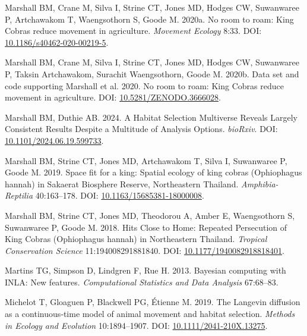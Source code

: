 \documentclass[10pt,a4paper]{article}
\newlength{\cslhangindent}
\newenvironment{CSLReferences}[2] %
 {\begin{list}{}{%
  \setlength{\itemindent}{0pt}
  \setlength{\leftmargin}{0pt}
  \setlength{\parsep}{0pt}
  \ifodd #1
   \setlength{\leftmargin}{\cslhangindent}
   \setlength{\itemindent}{-1\cslhangindent}
  \fi
  \setlength{\itemsep}{#2\baselineskip}}}
 {\end{list}}
\begin{document}
\begin{CSLReferences}{1}{0}
Marshall BM, Crane M, Silva I, Strine CT, Jones MD, Hodges CW, Suwanwaree P, Artchawakom T, Waengsothorn S, Goode M. 2020a. No room to roam: {King} {Cobras} reduce movement in agriculture. \emph{Movement Ecology} 8:33. DOI: \href{https://doi.org/10.1186/s40462-020-00219-5}{10.1186/s40462-020-00219-5}.

Marshall BM, Crane M, Silva I, Strine CT, Jones MD, Hodges CW, Suwanwaree P, Taksin Artchawakom, Surachit Waengsothorn, Goode M. 2020b. Data set and code supporting {Marshall} et al. 2020. {No} room to roam: {King} {Cobras} reduce movement in agriculture. DOI: \href{https://doi.org/10.5281/ZENODO.3666028}{10.5281/ZENODO.3666028}.

Marshall BM, Duthie AB. 2024. A {Habitat} {Selection} {Multiverse} {Reveals} {Largely} {Consistent} {Results} {Despite} a {Multitude} of {Analysis} {Options}. \emph{bioRxiv}. DOI: \href{https://doi.org/10.1101/2024.06.19.599733}{10.1101/2024.06.19.599733}.

Marshall BM, Strine CT, Jones MD, Artchawakom T, Silva I, Suwanwaree P, Goode M. 2019. Space fit for a king: Spatial ecology of king cobras ({Ophiophagus} hannah) in {Sakaerat} {Biosphere} {Reserve}, {Northeastern} {Thailand}. \emph{Amphibia-Reptilia} 40:163--178. DOI: \href{https://doi.org/10.1163/15685381-18000008}{10.1163/15685381-18000008}.

Marshall BM, Strine CT, Jones MD, Theodorou A, Amber E, Waengsothorn S, Suwanwaree P, Goode M. 2018. Hits {Close} to {Home}: {Repeated} {Persecution} of {King} {Cobras} ({Ophiophagus} hannah) in {Northeastern} {Thailand}. \emph{Tropical Conservation Science} 11:194008291881840. DOI: \href{https://doi.org/10.1177/1940082918818401}{10.1177/1940082918818401}.

Martins TG, Simpson D, Lindgren F, Rue H. 2013. Bayesian computing with {INLA}: {N}ew features. \emph{Computational Statistics and Data Analysis} 67:68--83.

Michelot T, Gloaguen P, Blackwell PG, Étienne M. 2019. The {Langevin} diffusion as a continuous‐time model of animal movement and habitat selection. \emph{Methods in Ecology and Evolution} 10:1894--1907. DOI: \href{https://doi.org/10.1111/2041-210X.13275}{10.1111/2041-210X.13275}.


\end{CSLReferences}
\end{document}
